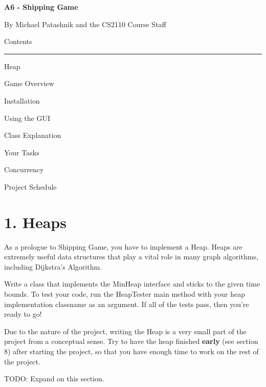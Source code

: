 \documentclass[11pt]{article}
\begin{document}
\lstset{language=Java}
\begin{center}
\begin{HUGE}{\bf A6 - Shipping Game}\\ \end{HUGE}
\vspace{3mm}
\begin{LARGE} By Michael Patashnik and the CS2110 Course Staff\\ \end{LARGE}
\vspace{7mm}
\begin{LARGE} Contents\\ \end{LARGE}
\noindent\rule{8cm}{0.4pt}
\begin{enumerate} \begin{large}
\item Heap
\item Game Overview
\item Installation
\item Using the GUI
\item Class Explanation
\item Your Tasks
\item Concurrency
\item Project Schedule
\end{large}\end{enumerate}
\end{center}
\newpage

\section{1. Heaps}
As a prologue to Shipping Game, you have to implement a Heap. Heaps are extremely useful data structures that play a vital role in many graph algorithms, including Dijkstra's Algorithm.

Write a class that implements the MinHeap interface and sticks to the given time bounds. To test your code, run the HeapTester main method with your heap implementation classname as an argument. If all of the tests pass, then you're ready to go!

Due to the nature of the project, writing the Heap is a very small part of the project from a conceptual sense. Try to have the heap finished \textbf{early} (see section 8) after starting the project, so that you have enough time to work on the rest of the project.

TODO: Expand on this section.
\end{document}
